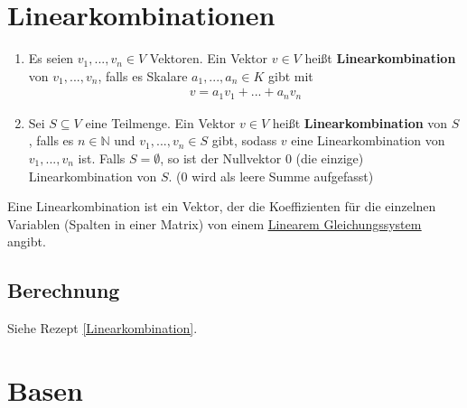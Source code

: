 \documentclass{scrartcl}
\newcommand{\linkToRef}[2][ref]{\hyperref[#1]{\underline{#2}}}
\begin{document}
\newpage
\section{Linearkombinationen}
\begin{Def}
    \begin{enumerate}[label={(\alph*)}]
    \item Es seien $v_1, ..., v_n \in V$ Vektoren. Ein Vektor $v \in V$ heißt \textbf{Linearkombination} von $v_1, ..., v_n$, falls es Skalare $a_1, ..., a_n \in K$ gibt mit
        \begin{align*}
            v = a_1v_1 + ... + a_nv_n
        \end{align*}
    \item Sei $S \subseteq V$ eine Teilmenge. Ein Vektor $v \in V$ heißt \textbf{Linearkombination} von $S$, falls es $n \in \mathbb{N}$ und $v_1, ..., v_n \in S$ gibt, sodass $v$ eine Linearkombination von $v_1, ..., v_n$ ist. Falls $S = \emptyset$, so ist der Nullvektor $0$ (die einzige) Linearkombination von $S$. ($0$ wird als leere Summe aufgefasst)
    \end{enumerate}
\end{Def}
\begin{Notiz}
    Eine Linearkombination ist ein Vektor, der die Koeffizienten für die einzelnen Variablen (Spalten in einer Matrix) von einem \linkToRef[Lineares Gleichungssystem]{Linearem Gleichungssystem} angibt.
\end{Notiz}

\subsection{Berechnung}
Siehe Rezept \ref{Linearkombination}.

\newpage
\section{Basen}
\label{Basis}
\end{document}
